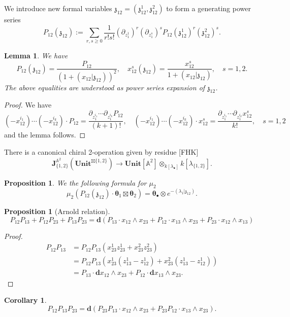 \documentclass[11pt]{amsart}
\newtheorem{cor}[thm]{Corollary}
\newtheorem{lem}[thm]{Lemma}
\newtheorem{prop}[thm]{Proposition}
\theoremstyle{definition}
\theoremstyle{remark}
\numberwithin{equation}{section}
\begin{document}
We introduce new formal variables $\mathfrak{z}_{12}=(\mathfrak{z}_{12}^1,\mathfrak{z}^2_{12})$ to form a generating power series
$$
P_{12}(\mathfrak{z}_{12}):=\sum_{r,s\geq 0}\frac{1}{r!s!}(\partial_{z^1_1})^r(\partial_{z^s_1})^sP_{12}(\mathfrak{z}^1_{12})^r(\mathfrak{z}^2_{12})^s.
$$

\begin{lem}
  We have
  $$
  P_{12}(\mathfrak{z}_{12})=\frac{P_{12}}{\left(1+(x_{12}|\mathfrak{z}_{12})\right)^2},\quad x^s_{12}(\mathfrak{z}_{12})=\frac{x^s_{12}}{1+(x_{12}|\mathfrak{z}_{12})},\quad s=1,2.
  $$
  The above equalities are understood as power series expansion of $\mathfrak{z}_{12}$.
\end{lem}

\begin{proof}
  We have
  $$
  (-x^{i_1}_{12})\cdots (-x^{i_k}_{12})\cdot P_{12}=\frac{\partial_{z^{i_1}_1}\cdots \partial_{z^{i_k}_1}P_{12}}{  (k+1)!},\quad   (-x^{i_1}_{12})\cdots (-x^{i_k}_{12})\cdot x^s_{12}=\frac{\partial_{z^{i_1}_1}\cdots \partial_{z^{i_k}_1}x^s_{12}}{  k!},\quad s=1,2
  $$
  and the lemma follows.
\end{proof}

There is a canonical chiral 2-operation  given by residue [FHK]
$$
\mathbf{J}^{\mathbb{A}^2}_{\{1,2\}}(\mathbf{Unit}^{\boxtimes\{1,2\} })\rightarrow \mathbf{Unit}[\mathbb{A}^2]\otimes_{k[\lambda_{\bullet}]}k[\lambda_{\{1,2\}}].
$$

\begin{prop}
We the following formula for $\mu_2$
$$
\mu_2\left(P_{12}(\mathfrak{z}_{12})\cdot  \boldsymbol{\theta}_1\boxtimes  \boldsymbol{\theta}_2\right)=\boldsymbol{\theta}_{\bullet}\otimes e^{-(\lambda_1|\mathfrak{z}_{12})}.
$$
\end{prop}

\begin{prop}[Arnold relation]
  $$
  P_{12}P_{13}+P_{12}P_{23}+P_{13}P_{23}=\mathbf{d}\left(P_{13}\cdot x_{12}\wedge x_{23}+P_{12}\cdot x_{13}\wedge x_{23}+P_{23}\cdot x_{12}\wedge x_{13}\right)
  $$
\end{prop}
\begin{proof}

  \begin{align*}
   P_{12}P_{13}  &=P_{12}P_{13}(x^1_{23}z^1_{23}+x^2_{23}z^2_{23})  \\
     & =P_{12}P_{13}\left(x^1_{23}(z^1_{13}-z^1_{12})+x^2_{23}(z^1_{13}-z^1_{12})\right)\\
     &=P_{13}\cdot \mathbf{d}x_{12}\wedge x_{23}+P_{12}\cdot \mathbf{d}x_{13}\wedge x_{23}.
  \end{align*}
\end{proof}
\begin{cor}\label{RecursiveLemma}
  $$
  P_{12}P_{13}P_{23}=\mathbf{d}\left(P_{23}P_{13}\cdot x_{12}\wedge x_{23}+P_{23}P_{12}\cdot x_{13}\wedge x_{23}\right).
  $$
\end{cor}
\end{document}
